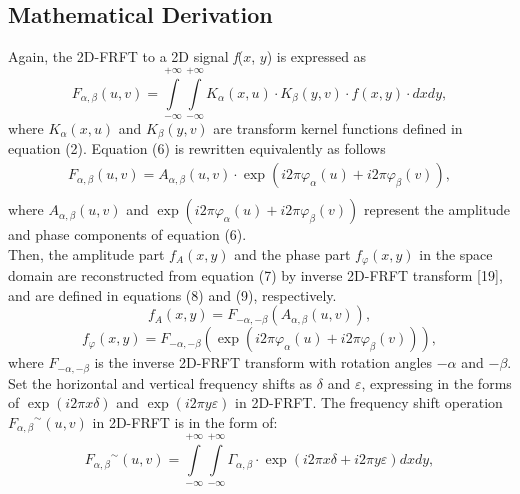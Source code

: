 \documentclass[journal]{IEEEtran}
\begin{document}
\subsection{Mathematical Derivation}
Again, the 2D-FRFT to a 2D signal \emph{f}(\emph{$x$}, \emph{$y$}) is expressed as
\begin{equation}
{F_{\alpha ,\beta }}(u,v) = \int\limits_{ - \infty }^{ + \infty } {\int\limits_{ - \infty }^{ + \infty } {{K_\alpha }(x,u)\cdot{K_\beta }(y,v)\cdot f(x,y)\cdot dxdy} },
\end{equation}
where $ {{K_\alpha }\left( {x,u} \right)}$ and $ {{K_\beta }\left( {y,v} \right)}$ are transform kernel functions defined in equation (2). Equation (6) is rewritten equivalently as follows
\begin{equation}
\begin{array}{l}
 {F_{\alpha ,\beta }}(u,v) = {A_{\alpha ,\beta }}(u,v)\cdot\exp (i2\pi {\varphi _\alpha }(u) + i2\pi {\varphi _\beta }(v)), \\
 \end{array}
\end{equation}
where ${A_{\alpha ,\beta }}(u,v)$ and $\exp (i2\pi {\varphi _\alpha }(u) + i2\pi {\varphi _\beta }(v))$ represent the amplitude and phase components of equation (6). \\\indent Then, the amplitude part $ {f_{A}(x,y)} $ and the phase part $ {f_{\varphi}(x,y)} $ in the space domain are reconstructed from equation (7) by inverse 2D-FRFT transform [19], and are defined in equations (8) and (9), respectively.
\begin{equation}
{f_{A}}(x,y) = {F_{ - \alpha , - \beta }}({A_{\alpha ,\beta }}(u,v)),
\end{equation}
\begin{equation}
{f_{\varphi}}(x,y) = {F_{ - \alpha , - \beta }}(\exp (i2\pi {\varphi _\alpha }(u) + i2\pi {\varphi _\beta }(v))),
\end{equation}
where $F_{ - \alpha , - \beta }$ is the inverse 2D-FRFT transform with rotation angles $-\alpha$ and $-\beta$.\\\indent Set the horizontal and vertical frequency shifts as $\delta$ and $\varepsilon$, expressing in the forms of $ \exp (i2\pi x\delta ) $ and $\exp (i2\pi y\varepsilon ) $ in 2D-FRFT. The frequency shift operation ${F_{\alpha ,\beta }}^\sim(u,v)$ in 2D-FRFT is in the form of:
\begin{equation}
{F_{\alpha ,\beta }}^\sim(u,v) = \int\limits_{ - \infty }^{ + \infty } {\int\limits_{ - \infty }^{ + \infty } {{\Gamma _{\alpha ,\beta }}\cdot\exp (i2\pi x\delta + i2\pi y\varepsilon )dx} } dy,
\end{equation}
\end{document}
